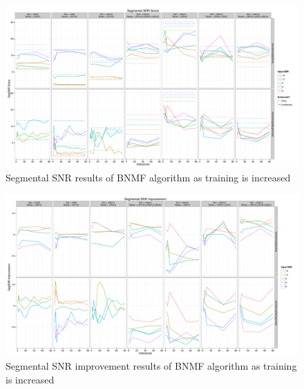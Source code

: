 \begin{figure}[p]
\noindent \begin{centering}
\includegraphics[angle=90,width=1\textwidth,height=0.95\textheight]{fig/R/train/segSNR}
\par\end{centering}

\protect\caption{\label{fig:vary-train-segsnr}Segmental \acs{SNR} results of \acs{BNMF}
algorithm as training is increased}
\end{figure}


\begin{figure}[p]
\noindent \begin{centering}
\includegraphics[angle=90,width=1\textwidth,height=0.95\textheight]{fig/R/train/segSNRImp}
\par\end{centering}

\protect\caption{\label{fig:vary-train-segsnr-imp}Segmental \acs{SNR} improvement
results of \acs{BNMF} algorithm as training is increased}
\end{figure}


